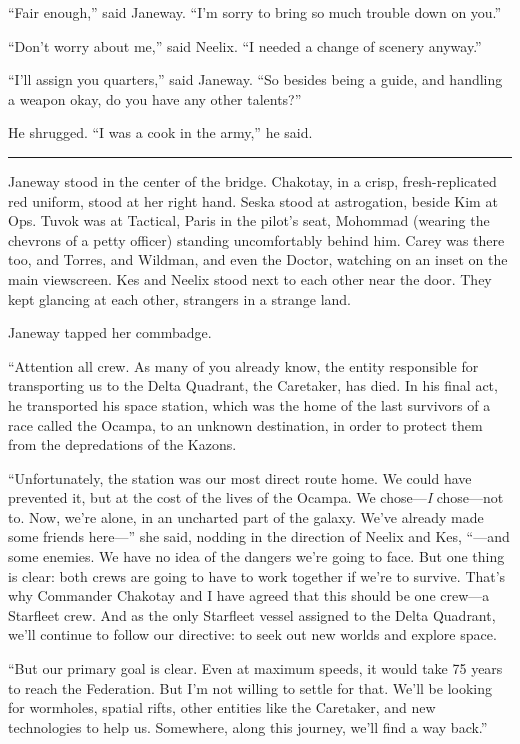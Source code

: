 \documentclass[twoside,letterpaper,12pt]{memoir}
\begin{document}
``Fair enough,'' said Janeway. ``I’m sorry to bring so much trouble down on you.'' 

``Don’t worry about me,'' said Neelix. ``I needed a change of scenery anyway.'' 

``I’ll assign you quarters,'' said Janeway. ``So besides being a guide, and handling a weapon okay, do you have any other talents?'' 

He shrugged. ``I was a cook in the army,'' he said. 

\fancybreak{\rule{3cm}{0.4 pt}} 

Janeway stood in the center of the bridge. Chakotay, in a crisp, fresh-replicated red uniform, stood at her right hand. Seska stood at astrogation, beside Kim at Ops. Tuvok was at Tactical, Paris in the pilot’s seat, Mohommad (wearing the chevrons of a petty officer) standing uncomfortably behind him. Carey was there too, and Torres, and Wildman, and even the Doctor, watching on an inset on the main viewscreen. Kes and Neelix stood next to each other near the door. They kept glancing at each other, strangers in a strange land. 

Janeway tapped her commbadge. 

``Attention all crew. As many of you already know, the entity responsible for transporting us to the Delta Quadrant, the Caretaker, has died. In his final act, he transported his space station, which was the home of the last survivors of a race called the Ocampa, to an unknown destination, in order to protect them from the depredations of the Kazons. 

``Unfortunately, the station was our most direct route home. We could have prevented it, but at the cost of the lives of the Ocampa. We chose---\textit{I }chose---not to. Now, we’re alone, in an uncharted part of the galaxy. We’ve already made some friends here---'' she said, nodding in the direction of Neelix and Kes, ``---and some enemies. We have no idea of the dangers we're going to face. But one thing is clear: both crews are going to have to work together if we're to survive. That's why Commander Chakotay and I have agreed that this should be one crew---a Starfleet crew. And as the only Starfleet vessel assigned to the Delta Quadrant, we'll continue to follow our directive: to seek out new worlds and explore space. 

``But our primary goal is clear. Even at maximum speeds, it would take 75 years to reach the Federation. But I'm not willing to settle for that. We'll be looking for wormholes, spatial rifts, other entities like the Caretaker, and new technologies to help us. Somewhere, along this journey, we'll find a way back.'' 
\end{document}
